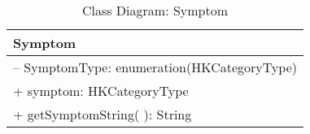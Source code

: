 \begin{table}[ht]
\centering
\caption{Class Diagram: Symptom}

\hspace{1em}
\renewcommand{\arraystretch}{1.7}

\begin{tabular}{|l|}
\hline
\textbf{Symptom} \\
\hline
– SymptomType: enumeration(HKCategoryType) \\
+ symptom: HKCategoryType \\
\hdashline
+ getSymptomString( ): String \\
\hline
\end{tabular}
\end{table}
